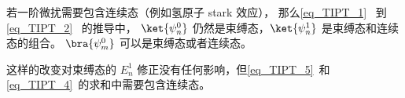 
若一阶微扰需要包含连续态（例如氢原子 stark 效应）， 那么\autoref{eq_TIPT_1}~ 到\autoref{eq_TIPT_2}~ 的推导中， $\ket{\psi_n^0}$ 仍然是束缚态，$\ket{\psi_n^1}$ 是束缚态和连续态的组合。 $\bra{\psi_m^0}$ 可以是束缚态或者连续态。

这样的改变对束缚态的 $E_n^1$ 修正没有任何影响，但\autoref{eq_TIPT_5}~和\autoref{eq_TIPT_4}~的求和中需要包含连续态。
